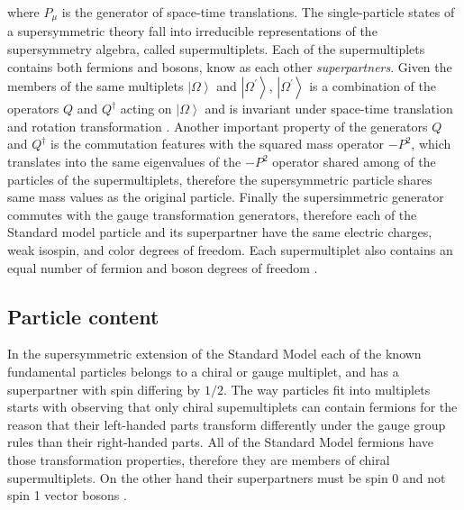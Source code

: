 where $P_{\mu}$ is the generator of space-time translations. The single-particle states of a supersymmetric theory fall into irreducible representations of the supersymmetry algebra, called supermultiplets. Each of the supermultiplets contains both fermions and bosons, know as each other \textit{superpartners}. Given the members of the same multiplets $\left|\Omega\right>$ and $\left|\Omega^{\prime}\right>$, $\left|\Omega^{\prime}\right>$ is a combination of the operators $Q$ and $Q^{\dagger}$ acting on $\left|\Omega\right>$ and is invariant under space-time translation and rotation transformation \cite{Martin:1997ns}. Another important property of the generators $Q$ and $Q^{\dagger}$ is the commutation features with the squared mass operator $-P^{2}$, which translates into the same eigenvalues of the $-P^{2}$ operator shared among of the particles of the supermultiplets, therefore the supersymmetric particle shares same mass values as the original particle. Finally the supersimmetric generator commutes with the gauge transformation generators, therefore each of the Standard model particle and its superpartner have the same electric charges, weak isospin, and color degrees of freedom.
Each supermultiplet also contains an equal number of fermion and boson degrees of freedom \cite{Martin:1997ns}.

\subsection{Particle content}

\FloatBarrier

In the supersymmetric extension of the Standard Model each of the known fundamental particles belongs to a chiral or gauge multiplet, and has a superpartner with spin differing by $1/2$. The way particles fit into multiplets starts with observing that only chiral supemultiplets can contain fermions for the reason that their left-handed parts transform differently under the gauge group rules than their right-handed parts. All of the Standard Model fermions have those transformation properties, therefore they are members of chiral supermultiplets. On the other hand their superpartners must be spin 0 and not spin 1 vector bosons \cite{Martin:1997ns}.

